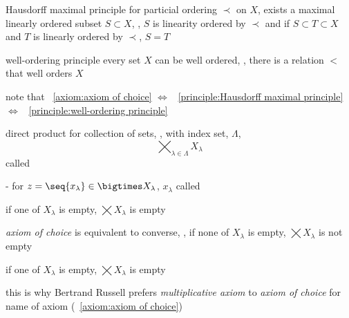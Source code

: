 \documentclass[17pt,landscape]{foils}
\begin{document}
{\begin{myprinciple}{Hausdorff maximal principle}%
	for particial ordering $\prec$ on $X$,
	exists a maximal linearly ordered subset $S\subset X$,
	\ie,
	$S$ is linearity ordered by $\prec$
	and if $S\subset T\subset X$ and $T$ is linearly ordered by $\prec$,
	$S=T$
\end{myprinciple}

\vfill

\begin{myprinciple}{well-ordering principle}
	every set $X$ can be well ordered,
		\ie,
	there is a relation $<$ that well orders $X$
\end{myprinciple}

\bit
\item
	note that
	\axiomname~\ref{axiom:axiom of choice}
	$\Leftrightarrow$
	\principlename~\ref{principle:Hausdorff maximal principle}
	$\Leftrightarrow$
	\principlename~\ref{principle:well-ordering principle}
\eit



\begin{mydefinition}{direct product}
	for collection of sets, , with index set, $\Lambda$,
	$$
		\bigtimes_{\lambda\in\Lambda} X_\lambda
	$$
	called 
	\bit
	\item [-]
		for $z=\seq{x_\lambda}\in\bigtimes X_\lambda$,
		$x_\lambda$ called 
	\eit
\end{mydefinition}

\bit
\item
	if one of $X_\lambda$ is empty, $\bigtimes X_\lambda$ is empty

\item
	\emph{axiom of choice} is equivalent to converse, \ie,
		if none of $X_\lambda$ is empty, $\bigtimes X_\lambda$ is not empty

	if one of $X_\lambda$ is empty, $\bigtimes X_\lambda$ is empty

\item
	this is why Bertrand Russell prefers \emph{multiplicative axiom} to \emph{axiom of choice} for name of axiom (\axiomname~\ref{axiom:axiom of choice})%
		\
\eit




}
\end{document}
